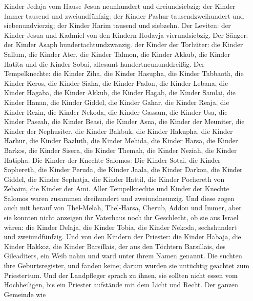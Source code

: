 Kinder Jedaja vom Hause Jesua neunhundert und dreiundsiebzig;
 der Kinder Immer tausend und zweiundfünfzig; 
der Kinder Pashur tausendzweihundert und siebenundvierzig; 
der Kinder Harim tausend und siebzehn.  Der Leviten: der
Kinder Jesua und Kadmiel von den Kindern Hodavja vierundsiebzig.
 Der Sänger: der Kinder Asaph hundertachtundzwanzig.
 der Kinder der Torhüter: die Kinder Sallum, die Kinder
Ater, die Kinder Talmon, die Kinder Akkub, die Kinder Hatita und die
Kinder Sobai, allesamt hundertneununddreißig.  Der
Tempelknechte: die Kinder Ziha, die Kinder Hasupha, die Kinder Tabbaoth,
 die Kinder Keros, die Kinder Siaha, die Kinder Padon,
 die Kinder Lebana, die Kinder Hagaba, die Kinder Akkub,
 die Kinder Hagab, die Kinder Samlai, die Kinder Hanan,
 die Kinder Giddel, die Kinder Gahar, die Kinder Reaja,
 die Kinder Rezin, die Kinder Nekoda, die Kinder Gassam,
 die Kinder Usa, die Kinder Paseah, die Kinder Beasi,
 die Kinder Asna, die Kinder der Meuniter, die Kinder der
Nephusiter,  die Kinder Bakbuk, die Kinder Hakupha, die
Kinder Harhur,  die Kinder Bazluth, die Kinder Mehida, die
Kinder Harsa,  die Kinder Barkos, die Kinder Sisera, die
Kinder Themah,  die Kinder Neziah, die Kinder Hatipha.
 Die Kinder der Knechte Salomos: Die Kinder Sotai, die
Kinder Sophereth, die Kinder Peruda,  die Kinder Jaala, die
Kinder Darkon, die Kinder Giddel,  die Kinder Sephatja, die
Kinder Hattil, die Kinder Pochereth von Zebaim, die Kinder der Ami.
 Aller Tempelknechte und Kinder der Knechte Salomos waren
zusammen dreihundert und zweiundneunzig.  Und diese zogen
auch mit herauf von Thel-Melah, Thel-Harsa, Cherub, Addon und Immer,
aber sie konnten nicht anzeigen ihr Vaterhaus noch ihr Geschlecht, ob
sie aus Israel wären:  die Kinder Delaja, die Kinder Tobia,
die Kinder Nekoda, sechshundert und zweiundfünfzig.  Und
von den Kindern der Priester: die Kinder Habaja, die Kinder Hakkoz, die
Kinder Barsillais, der aus den Töchtern Barsillais, des Gileaditers, ein
Weib nahm und ward unter ihrem Namen genannt.  Die suchten
ihre Geburtsregister, und fanden keine; darum wurden sie untüchtig
geachtet zum Priestertum.  Und der Landpfleger sprach zu
ihnen, sie sollten nicht essen vom Hochheiligen, bis ein Priester
aufstände mit dem Licht und Recht.  Der ganzen Gemeinde wie

